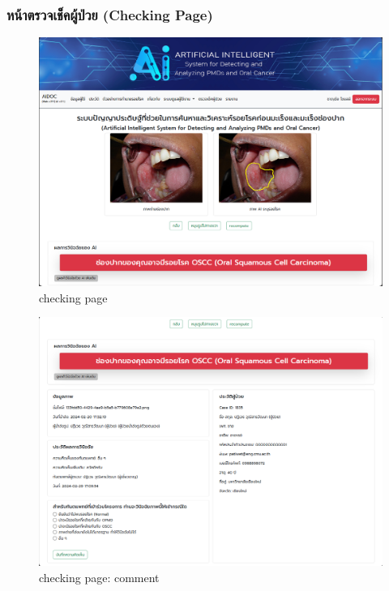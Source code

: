 \subsubsection{หน้าตรวจเช็คผู้ป่วย (Checking Page)}
\begin{figure}[H]
  \centering
  \graphicspath{{./images/}}
  \includegraphics[scale=0.3]{checking_user.png}
  \caption{checking page}
  \label{fig:checking_user}
\end{figure}

\begin{figure}[H]
  \centering
  \graphicspath{{./images/}}
  \includegraphics[scale=0.3]{dentist_comment_user.png}
  \caption{checking page: comment}
  \label{fig:dentist_comment_user}
\end{figure}

